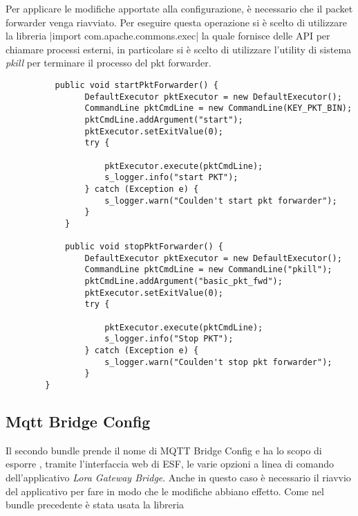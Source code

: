 Per applicare le modifiche apportate alla configurazione, è necessario che
il packet forwarder venga riavviato. Per eseguire questa operazione si è scelto di
utilizzare la libreria 
|import com.apache.commons.exec|
la quale fornisce delle API per chiamare processi esterni, in particolare
si è scelto di utilizzare l'utility di sistema \emph{pkill} per terminare il
processo del pkt forwarder.
\begin{verbatim}
          public void startPktForwarder() {
                DefaultExecutor pktExecutor = new DefaultExecutor();
                CommandLine pktCmdLine = new CommandLine(KEY_PKT_BIN);
                pktCmdLine.addArgument("start");
                pktExecutor.setExitValue(0);
                try {

                    pktExecutor.execute(pktCmdLine);
                    s_logger.info("start PKT");
                } catch (Exception e) {
                    s_logger.warn("Coulden't start pkt forwarder");
                }
            }

            public void stopPktForwarder() {
                DefaultExecutor pktExecutor = new DefaultExecutor();
                CommandLine pktCmdLine = new CommandLine("pkill");
                pktCmdLine.addArgument("basic_pkt_fwd");
                pktExecutor.setExitValue(0);
                try {

                    pktExecutor.execute(pktCmdLine);
                    s_logger.info("Stop PKT");
                } catch (Exception e) {
                    s_logger.warn("Coulden't stop pkt forwarder");
                }
        }

\end{verbatim}




\subsection{Mqtt Bridge Config}
Il secondo bundle prende il nome di MQTT Bridge Config e ha lo scopo 
di esporre , tramite l'interfaccia web di ESF, le varie opzioni a linea di
comando dell'applicativo
 \emph{Lora Gateway Bridge}.  Anche in questo caso è necessario il
riavvio del applicativo per fare in modo che le modifiche abbiano effetto. 
Come nel bundle precedente è stata usata la libreria

